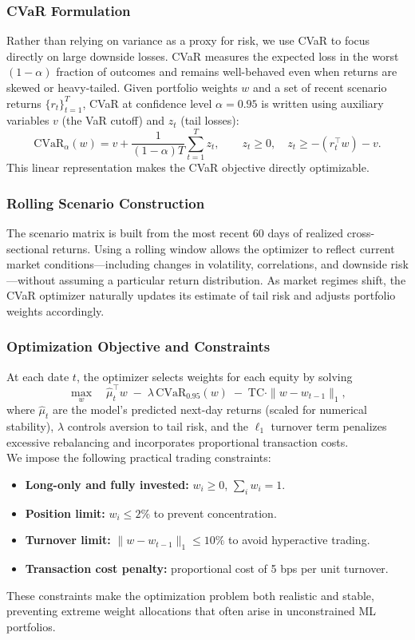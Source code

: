 \documentclass[11pt]{article}
\begin{document}
\subsubsection{CVaR Formulation}
Rather than relying on variance as a proxy for risk, we use CVaR to focus directly on large downside losses. CVaR measures
the expected loss in the worst $(1-\alpha)$ fraction of outcomes and remains
well-behaved even when returns are skewed or heavy-tailed. Given portfolio weights $w$ and a set of recent scenario returns
$\{r_t\}_{t=1}^{T}$, CVaR at confidence level $\alpha = 0.95$ is written using
auxiliary variables $v$ (the VaR cutoff) and $z_t$ (tail losses):
\[
\mathrm{CVaR}_{\alpha}(w)
    = v + \frac{1}{(1-\alpha)T}
      \sum_{t=1}^{T} z_t,
\qquad
z_t \ge 0,\quad
z_t \ge -(r_t^\top w) - v.
\]
This linear representation makes the CVaR objective directly optimizable.

\subsubsection{Rolling Scenario Construction}
The scenario matrix is built from the most recent 60 days of realized
cross-sectional returns. Using a rolling window allows the optimizer to reflect
current market conditions---including changes in volatility, correlations, and
downside risk—without assuming a particular return distribution. As market
regimes shift, the CVaR optimizer naturally updates its estimate of tail risk
and adjusts portfolio weights accordingly.


\subsubsection{Optimization Objective and Constraints}
At each date $t$, the optimizer selects weights for each equity by solving
\[
\max_{w}
\quad
\hat{\mu}_t^\top w
\;-\;
\lambda\, \mathrm{CVaR}_{0.95}(w)
\;-\;
\mathrm{TC} \cdot \| w - w_{t-1} \|_1,
\]
\noindent where $\hat{\mu}_t$ are the model's predicted next-day returns (scaled for
numerical stability), $\lambda$ controls aversion to tail risk, and the
$\ell_1$ turnover term penalizes excessive rebalancing and incorporates
proportional transaction costs. \\

\noindent We impose the following practical trading constraints:
\begin{itemize}
    \item \textbf{Long-only and fully invested:}
          $w_i \ge 0$, $\sum_i w_i = 1$.
    \item \textbf{Position limit:}
          $w_i \le 2\%$ to prevent concentration.
    \item \textbf{Turnover limit:}
          $\|w - w_{t-1}\|_1 \le 10\%$ to avoid hyperactive trading.
    \item \textbf{Transaction cost penalty:}
          proportional cost of 5 bps per unit turnover.
\end{itemize}
These constraints make the optimization problem both realistic and stable,
preventing extreme weight allocations that often arise in unconstrained ML
portfolios.
\end{document}
